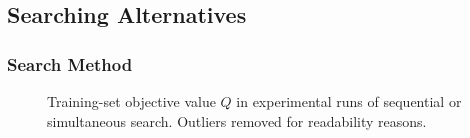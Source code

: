 \documentclass[conference]{IEEEtran}
\theoremstyle{definition}
\begin{document}
\subsection{Searching Alternatives}

\subsubsection{Search Method}

\begin{figure}[t]
	\centering
		\label{fig:impact-search-stddev-objective}
	\hfill
		\label{fig:impact-search-mean-objective}
	\caption{Training-set objective value $Q$ in experimental runs of sequential or simultaneous search.
	Outliers removed for readability reasons.}
	\label{fig:impact-search-objective}
\end{figure}
\end{document}
